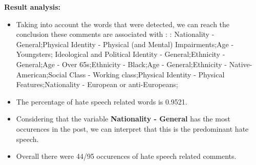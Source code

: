 \documentclass[11pt]{article}
\newlength\mylength
\begin{document}
\begin{center}
\begin{longtable}{|C{.50\mylength}|C{.30\mylength}|C{.15\mylength}|C{.15\mylength}|C{.15\mylength}|}
\end{longtable}
\end{center}


\textbf{\Large Result analysis:}

\begin{itemize}\item Taking into account the words that were detected, we can reach the conclusion these comments are associated with : : Nationality - General;Physical Identity - Physical (and Mental) Impairments;Age - Youngsters; Ideological and Political Identity - General;Ethnicity - General;Age - Over 65s;Ethnicity - Black;Age - General;Ethnicity - Native-American;Social Class - Working class;Physical Identity - Physical Features;Nationality - European or anti-Europeans;%

\item The percentage of hate speech related words is 0.9521.

\item Considering that the variable \textbf{Nationality - General} has the most occurences in the post, we can interpret that this is the predominant hate speech.

\item Overall there were 44/95 occurences of hate speech related comments.\end{itemize}
\end{document}
